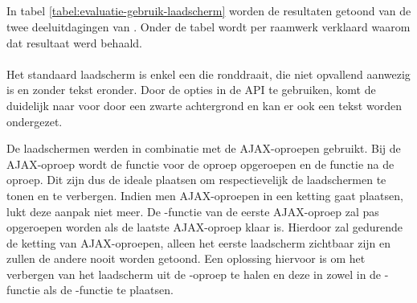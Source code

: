 
\subsection{} 
\label{sec:evaluatie-gebruik-laadscherm}

In tabel \ref{tabel:evaluatie-gebruik-laadscherm} worden de resultaten getoond van de twee deeluitdagingen van .
Onder de tabel wordt per raamwerk verklaard waarom dat resultaat werd behaald.

\begin{table}[H]
\centering
{}
\caption{Gebruik van  voor \st{}~(\sta), \kendo{}~(\kendoa), \jqm{}~(\jqma) en \lungo{}~(\lungoa).}
\label{tabel:evaluatie-gebruik-laadscherm}
\end{table}

\paragraph{\jqm}
Het standaard laadscherm is enkel een  die ronddraait, die niet opvallend aanwezig is en zonder tekst eronder.
Door de opties in de API te gebruiken, komt de  duidelijk naar voor door een zwarte achtergrond en kan er ook een tekst worden ondergezet.

De laadschermen werden in combinatie met de AJAX-oproepen gebruikt.
Bij de AJAX-oproep wordt de functie  voor de oproep opgeroepen en de functie  na de oproep.
Dit zijn dus de ideale plaatsen om respectievelijk de laadschermen te tonen en te verbergen.
Indien men AJAX-oproepen in een ketting gaat plaatsen, lukt deze aanpak niet meer.
De -functie van de eerste AJAX-oproep zal pas opgeroepen worden als de laatste AJAX-oproep klaar is.
Hierdoor zal gedurende de ketting van AJAX-oproepen, alleen het eerste laadscherm zichtbaar zijn en zullen de andere nooit worden getoond.
Een oplossing hiervoor is om het verbergen van het laadscherm uit de -oproep te halen en deze in zowel in de -functie als de -functie te plaatsen.

